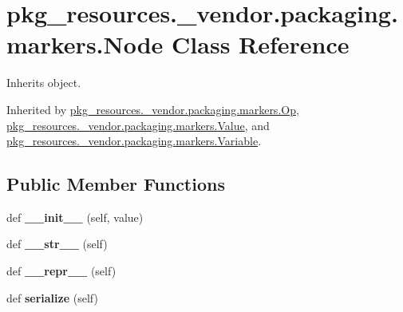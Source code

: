\hypertarget{classpkg__resources_1_1__vendor_1_1packaging_1_1markers_1_1_node}{}\section{pkg\+\_\+resources.\+\_\+vendor.\+packaging.\+markers.\+Node Class Reference}
\label{classpkg__resources_1_1__vendor_1_1packaging_1_1markers_1_1_node}


Inherits object.



Inherited by \hyperlink{classpkg__resources_1_1__vendor_1_1packaging_1_1markers_1_1_op}{pkg\+\_\+resources.\+\_\+vendor.\+packaging.\+markers.\+Op}, \hyperlink{classpkg__resources_1_1__vendor_1_1packaging_1_1markers_1_1_value}{pkg\+\_\+resources.\+\_\+vendor.\+packaging.\+markers.\+Value}, and \hyperlink{classpkg__resources_1_1__vendor_1_1packaging_1_1markers_1_1_variable}{pkg\+\_\+resources.\+\_\+vendor.\+packaging.\+markers.\+Variable}.

\subsection*{Public Member Functions}
\begin{DoxyCompactItemize}
\item 
\mbox{\label{classpkg__resources_1_1__vendor_1_1packaging_1_1markers_1_1_node_a49178b86d635d213273db1e31421238b}} 
def {\bfseries \+\_\+\+\_\+init\+\_\+\+\_\+} (self, value)
\item 
\mbox{\label{classpkg__resources_1_1__vendor_1_1packaging_1_1markers_1_1_node_aa82169b9f6c8bc1fc27ef9764b76bc0c}} 
def {\bfseries \+\_\+\+\_\+str\+\_\+\+\_\+} (self)
\item 
\mbox{\label{classpkg__resources_1_1__vendor_1_1packaging_1_1markers_1_1_node_ac62e07ff6a24db5a4b5958ec29ebf07e}} 
def {\bfseries \+\_\+\+\_\+repr\+\_\+\+\_\+} (self)
\item 
\mbox{\label{classpkg__resources_1_1__vendor_1_1packaging_1_1markers_1_1_node_ae6c70ae287780c19058df0af9f25b573}} 
def {\bfseries serialize} (self)
\end{DoxyCompactItemize}
